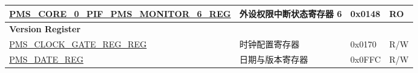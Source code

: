 \begin{longtable}{ | p{9.5cm} | p{7.5cm} | p{2cm} | p{} | }
\hyperref[regdesc:PMSCORE0PIFPMSMONITOR6REG]{PMS\_CORE\_0\_PIF\_PMS\_MONITOR\_6\_REG} & 外设权限中断状态寄存器 6 & 0x0148 & RO \\ \hline
\multicolumn{4}{|l|}{\textbf{Version Register}} \\ \hline
\hyperref[regdesc:PMSCLOCKGATEREGREG]{PMS\_CLOCK\_GATE\_REG\_REG} & 时钟配置寄存器 & 0x0170 & R/W \\ \hline
\hyperref[regdesc:PMSDATEREG]{PMS\_DATE\_REG} & 日期与版本寄存器 & 0x0FFC & R/W \\ \hline
\end{longtable}
